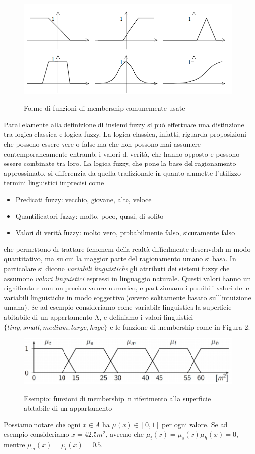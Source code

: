 \documentclass{article}
\begin{document}
	\begin{figure}[h]
		\centering
		{\includegraphics[width=.60\textwidth]{membership.png}} \quad
		\caption{Forme di funzioni di membership comunemente usate}
		\label{fig:membership}
		
	\end{figure}

	Parallelamente alla definizione di insiemi fuzzy si può effettuare una distinzione tra logica classica e logica fuzzy. La logica classica, infatti, riguarda proposizioni che possono essere vere o false ma che non possono mai assumere contemporaneamente entrambi i valori di verità, che hanno opposto e possono essere combinate tra loro.
	La logica fuzzy, che pone la base del ragionamento approssimato, si differenzia da quella tradizionale in quanto ammette l'utilizzo termini linguistici imprecisi come
	\begin{itemize}
		\item{Predicati fuzzy}: vecchio, giovane, alto, veloce
		\item{Quantificatori fuzzy}: molto, poco, quasi, di solito
		\item{Valori di verità fuzzy}: molto vero, probabilmente falso, sicuramente falso
	\end{itemize}	
	che permettono di trattare fenomeni della realtà difficilmente descrivibili in modo quantitativo, ma su cui la maggior parte del ragionamento umano si basa.
	In particolare si dicono \textit{variabili linguistiche} gli attributi dei sistemi fuzzy che assumono \textit{valori linguistici} espressi in linguaggio naturale. Questi valori hanno un significato e non un preciso valore numerico, e partizionano i possibili valori delle variabili linguistiche in modo soggettivo (ovvero solitamente basato sull'intuizione umana).
	Se ad esempio consideriamo come variabile linguistica la superficie abitabile di un appartamento A, e definiamo i valori linguistici $\{tiny, small, medium, large, huge\}$ e le funzione di membership come in Figura \ref{fig:mem2}:
	
	\begin{figure}[h]
		\centering
		{\includegraphics[width=.80\textwidth]{mem2.png}} \quad
		\caption{Esempio: funzioni di membership in riferimento alla superficie abitabile di un appartamento}
		\label{fig:mem2}
	\end{figure}
	Possiamo notare che ogni $x \in A$ ha $\mu(x) \in [0,1]$ per ogni valore. Se ad esempio consideriamo $x=42.5m^2$, avremo che $\mu_t(x)=\mu_s(x)\mu_h(x)=0$, mentre $\mu_m(x)=\mu_l(x)=0.5$.
	\\
	 
\end{document}
